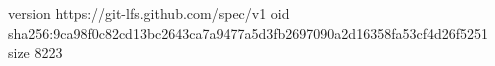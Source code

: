 version https://git-lfs.github.com/spec/v1
oid sha256:9ca98f0c82cd13bc2643ca7a9477a5d3fb2697090a2d16358fa53cf4d26f5251
size 8223
